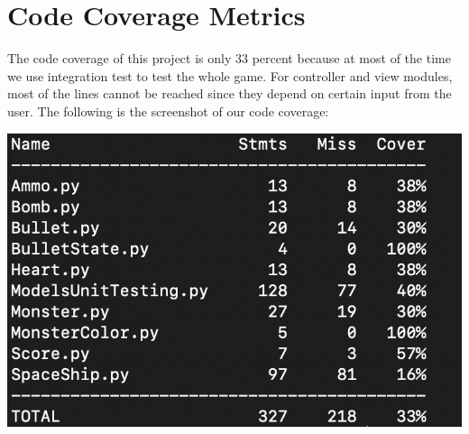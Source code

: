 \documentclass[12pt, titlepage]{article}
\begin{document}
\section{Code Coverage Metrics}
The code coverage of this project is only 33 percent because at most of the time we use integration test to test the whole game. For controller and view modules, most of the lines cannot be reached since they depend on certain input from the user. The 
following is the screenshot of our code coverage:
\begin{center}
\includegraphics[scale=1]{CodeCoverage.png}
\end{center}

\end{document}
